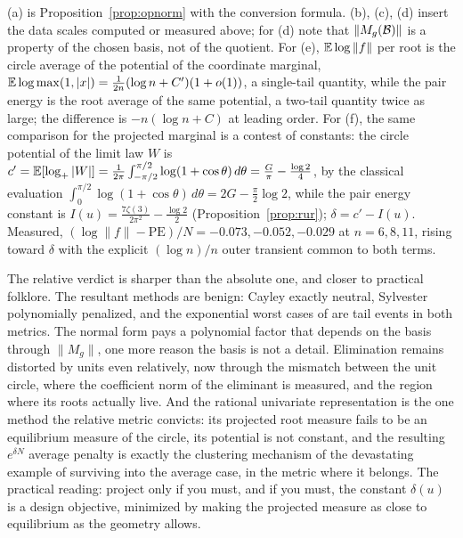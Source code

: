 \proofsketch
(a) is Proposition~\ref{prop:opnorm} with the conversion formula. (b), (c), (d) insert
the data scales computed or measured above; for (d) note that $\|M_g(\mathcal{B})\|$ is a
property of the chosen basis, not of the quotient. For (e), $\mathbb{E}\log\|f\|$ per root is
the circle average of the potential of the coordinate marginal,
$\mathbb{E}\log\max(1,|x|) = \frac1{2n}(\log n+C')(1+o(1))$, a single-tail quantity, while the
pair energy is the root average of the same potential, a two-tail quantity twice as
large; the difference is $-n(\log n+C)$ at leading order. For (f), the same comparison
for the projected marginal is a contest of constants: the circle potential of the limit
law $W$ is
$c' = \mathbb{E}[\log_+|W|] = \frac1{2\pi}\int_{-\pi/2}^{\pi/2}\log(1+\cos\theta)\,d\theta
= \frac G\pi - \frac{\log2}4$, by the classical evaluation
$\int_0^{\pi/2}\log(1+\cos\theta)\,d\theta = 2G - \frac\pi2\log2$, while the pair energy
constant is $I(u) = \frac{7\zeta(3)}{2\pi^2} - \frac{\log2}2$
(Proposition~\ref{prop:rur}); $\delta = c' - I(u)$. Measured,
$(\log\|f\| - \mathrm{PE})/N = -0.073, -0.052, -0.029$ at $n=6,8,11$, rising toward
$\delta$ with the explicit $(\log n)/n$ outer transient common to both terms.
\endproof

The relative verdict is sharper than the absolute one, and closer to practical folklore.
The resultant methods are benign: Cayley exactly neutral, Sylvester polynomially
penalized, and the exponential worst cases of \cite{noferini2016numerical} are tail
events in both metrics. The normal form pays a polynomial factor that depends on the
basis through $\|M_g\|$, one more reason the basis is not a detail. Elimination remains
distorted by units even relatively, now through the mismatch between the unit circle,
where the coefficient norm of the eliminant is measured, and the region where its roots
actually live. And the rational univariate representation is the one method the relative
metric convicts: its projected root measure fails to be an equilibrium measure of the
circle, its potential is not constant, and the resulting $e^{\delta N}$ average penalty
is exactly the clustering mechanism of the devastating example of
\cite[Sec.~4]{graf2026numerical} surviving into the average case, in the metric where it
belongs. The practical reading: project only if you must, and if you must, the constant
$\delta(u)$ is a design objective, minimized by making the projected measure as close to
equilibrium as the geometry allows.
